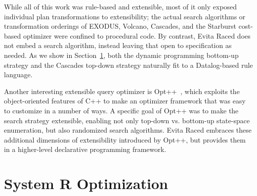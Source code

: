 While all of this work was rule-based and extensible, most of it only exposed
individual plan transformations to extensibility; the actual search algorithms
or transformation orderings of EXODUS, Volcano, Cascades, and the Starburst
cost-based optimizer were confined to procedural code.  By contrast, Evita Raced
does not embed a search algorithm, instead leaving that open to specification
as needed.  As we show in Section~\ref{ch:opt:sec:systemr}, both the dynamic programming
bottom-up strategy and the Cascades top-down strategy naturally fit to a
Datalog-based rule language.

Another interesting extensible query optimizer is Opt++~\cite{kabradewitt},
which exploits the object-oriented features of C++ to make an optimizer
framework that was easy to customize in a number of ways.  A specific goal of
Opt++ was to make the search strategy extensible, enabling not only top-down
vs.  bottom-up state-space enumeration, but also randomized search algorithms.
Evita Raced embraces these additional dimensions of extensibility introduced by
Opt++, but provides them in a higher-level declarative programming framework.


\section{System R Optimization}
\label{ch:opt:sec:systemr}

